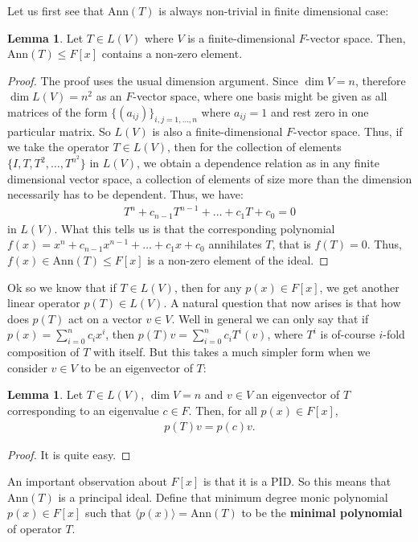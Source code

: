 \documentclass[letterpaper,11pt,twoside]{article}
\theoremstyle{definition}
\theoremstyle{definition}
\theoremstyle{definition}
\theoremstyle{definition}
\newtheorem{lemma}[proposition]{\textbf{Lemma}}
\theoremstyle{definition}
\theoremstyle{definition}
\theoremstyle{remark}
\theoremstyle{definition}
\newcommand{\Ann}[1]{\text{Ann}\left(#1\right)}
\newcommand{\gen}[1]{\langle #1\rangle}
\begin{document}
    Let us first see that $\Ann{T}$ is always non-trivial in finite dimensional case:
    \begin{lemma}\label{L-2.1.1}
    Let $T \in L(V)$ where $V$ is a finite-dimensional $F$-vector space. Then, $\Ann{T} \le F[x]$ contains a non-zero element.
    \end{lemma}
    \begin{proof}
    The proof uses the usual dimension argument. Since $\dim V = n$, therefore $\dim L(V) = n^2$ as an $F$-vector space, where one basis might be given as all matrices of the form $\{(a_{ij})\}_{i,j=1,\dots,n}$ where $a_{ij} = 1$ and rest zero in one particular matrix. So $L(V)$ is also a finite-dimensional $F$-vector space. Thus, if we take the operator $T\in L(V)$, then for the collection of elements $\{I,T,T^2,\dots, T^{n^2}\}$ in $L(V)$, we obtain a dependence relation as in any finite dimensional vector space, a collection of elements of size more than the dimension necessarily has to be dependent. Thus, we have:
    \begin{align*}
        T^n + c_{n-1} T^{n-1} + \dots + c_1 T + c_0 = 0
    \end{align*}
    in $L(V)$. What this tells us is that the corresponding polynomial $f(x) = x^n + c_{n-1} x^{n-1} + \dots +c_1 x + c_0$ annihilates $T$, that is $f(T) = 0$. Thus, $f(x) \in \Ann{T} \le F[x]$ is a non-zero element of the ideal.
    \end{proof}
    Ok so we know that if $T\in L(V)$, then for any $p(x) \in F[x]$, we get another linear operator $p(T) \in L(V)$. A natural question that now arises is that how does $p(T)$ act on a vector $v\in V$. Well in general we can only say that if $p(x) = \sum_{i=0}^n c_ix^i$, then $p(T)v = \sum_{i=0}^n c_i T^i(v)$, where $T^i$ is of-course $i$-fold composition of $T$ with itself. But this takes a much simpler form when we consider $v\in V$ to be an eigenvector of $T$:
    \begin{lemma}\label{L-2.1.2}
        Let $T\in L(V)$, $\dim V= n$ and $v\in V$ an eigenvector of $T$ corresponding to an eigenvalue $c\in F$. Then, for all $p(x) \in F[x]$,
        \begin{align*}
            p(T)v = p(c)v.
        \end{align*}
    \end{lemma}
    \begin{proof}
        It is quite easy.
    \end{proof}
    An important observation about $F[x]$ is that it is a PID. So this means that $\Ann{T}$ is a principal ideal. Define that minimum degree monic polynomial $p(x) \in F[x]$ such that $\gen{p(x)} = \Ann{T}$ to be the \textbf{minimal polynomial} of operator $T$. \\
    
\end{document}
